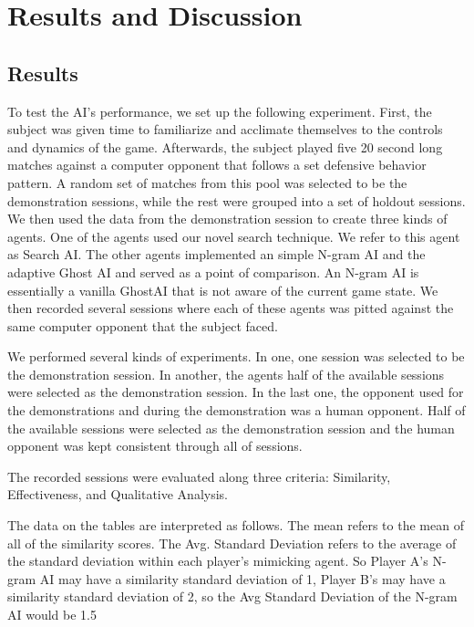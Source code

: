 
\chapter{Results and Discussion}

\label{Chapter5} %

\section{Results}

To test the AI's performance, we set up the following experiment. First, the subject was given time to familiarize and acclimate themselves to the controls and dynamics of the game. Afterwards, the subject played five 20 second long matches against a computer opponent that follows a set defensive behavior pattern. A random set of matches from this pool was selected to be the demonstration sessions, while the rest were grouped into a set of holdout sessions. We then used the data from the demonstration session to create three kinds of agents. One of the agents used our novel search technique. We refer to this agent as Search AI. The other agents implemented an simple N-gram AI and the adaptive Ghost AI and served as a point of comparison. An N-gram AI is essentially a vanilla GhostAI that is not aware of the current game state. We then recorded several sessions where each of these agents was pitted against the same computer opponent that the subject faced.

We performed several kinds of experiments. In one, one session was selected to be the demonstration session. In another, the agents half of the available sessions were selected as the demonstration session. In the last one, the opponent used for the demonstrations and during the demonstration was a human opponent. Half of the available sessions were selected as the demonstration session and the human opponent was kept consistent through all of sessions.

The recorded sessions were evaluated along three criteria: Similarity, Effectiveness, and Qualitative Analysis. 

The data on the tables are interpreted as follows. The mean refers to the mean of all of the similarity scores. The Avg. Standard Deviation refers to the average of the standard deviation within each player's mimicking agent. So Player A's N-gram AI may have a similarity standard deviation of 1, Player B's may have a similarity standard deviation of 2, so the Avg Standard Deviation of the N-gram AI would be 1.5

